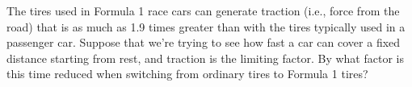 The tires used in Formula 1 race cars can generate traction (i.e., force from the road) that
is as much as 1.9 times greater than with the tires typically used
in a passenger car. Suppose that we're trying to see how fast a car
can cover a fixed distance starting from rest, and traction is the
limiting factor. By what factor is this time reduced when switching
from ordinary tires to Formula 1 tires?\answercheck
